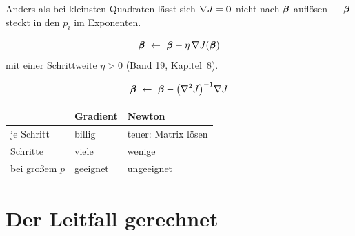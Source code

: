 \begin{merksatz}
Anders als bei kleinsten Quadraten lässt sich $\nabla J = \boldsymbol{0}$ nicht nach $\boldsymbol{\beta}$ auflösen --- $\boldsymbol{\beta}$ steckt in den $p_i$ im Exponenten.

\[ \boldsymbol{\beta} \ \leftarrow\ \boldsymbol{\beta} - \eta\,\nabla J(\boldsymbol{\beta}) \]
mit einer Schrittweite $\eta > 0$ (Band 19, Kapitel~8).

\[ \boldsymbol{\beta} \ \leftarrow\ \boldsymbol{\beta} - \bigl(\nabla^{2}J\bigr)^{-1}\nabla J \]

\begin{center}
{\small
\renewcommand{\arraystretch}{1.5}
\begin{tabular}{@{}P{2.4cm}P{3.0cm}P{3.0cm}@{}}
\toprule
& \textbf{Gradient} & \textbf{Newton}\\
\midrule
je Schritt & billig & teuer: Matrix lösen\\
Schritte & viele & wenige\\
bei großem $p$ & geeignet & ungeeignet\\
\bottomrule
\end{tabular}}
\end{center}

\begin{center}
\begin{minipage}{0.88\textwidth}
\end{minipage}
\end{center}
\end{merksatz}

\section{Der Leitfall gerechnet}

